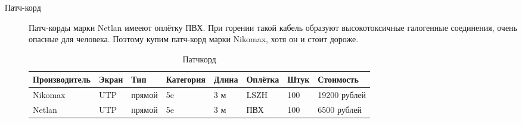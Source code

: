\begin{description}
\item[Патч-корд]
  Патч-корды марки Netlan имееют оплётку ПВХ. При горении такой кабель образуют высокотоксичные галогенные соединения, очень опасные для человека. Поэтому купим патч-корд марки Nikomax, хотя он и стоит дороже.
\begin{table}[!htp]
    \centering
    \begin{tabular}{|l|l|l|l|l|l|l|l|}%
      \hline
      Производитель & Экран & Тип & Категория & Длина & Оплётка & Штук & Стоимость \\ \hline
      Nikomax & UTP & прямой & 5e & 3 м & LSZH & 100 & 19200 рублей \\ \hline
      Netlan & UTP & прямой & 5e & 3 м & ПВХ & 100 & 6500 рублей \\ \hline

    \end{tabular}
    \caption{Патчкорд}
    \label{table:patchcord}
  \end{table}
  

\end{description}
